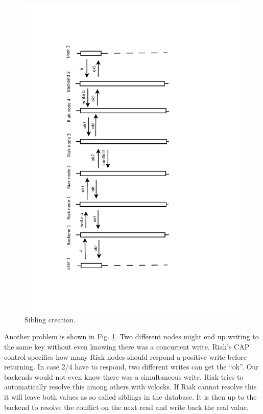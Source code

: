\documentclass[11pt,a4paper]{report}
\begin{document}
\begin{figure}[htbp!]
 \hspace{-3cm}
 \includegraphics[width=\textwidth, angle=-90]{./graphics/Concurrency_-_Siblings.pdf}
 \vspace{-4cm}
 \caption{Sibling creation.}
 \label{fig:concurrency:siblings}
\end{figure}
Another problem is shown in Fig. \ref{fig:concurrency:siblings}.
Two different nodes might end up writing to the same key without even knowing
there was a concurrent write.
Riak's CAP control specifies how many Riak nodes should respond a positive write
before returning.
In case 2/4 have to respond, two different writes can get the ``ok''.
Our backends would not even know there was a simultaneous write.
Riak tries to automatically resolve this among others with vclocks.
If Riak cannot resolve this it will leave both values as so called siblings
in the database.
It is then up to the backend to resolve the conflict on the next read
and write back the real value.
\end{document}
